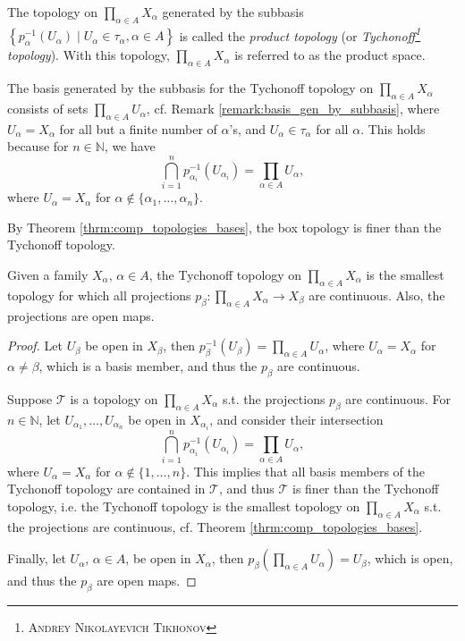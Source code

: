 \begin{defn}
	The topology on $\prod_{\alpha\in A}X_{\alpha}$ generated by the subbasis $\left\{p_{\alpha}^{-1}(U_{\alpha})\mid U_{\alpha}\in\tau_{\alpha}, \alpha\in A\right\}$ is called the \textit{product topology} (or \textit{Tychonoff\footnote{\textsc{Andrey Nikolayevich Tikhonov}} topology}). With this topology, $\prod_{\alpha\in A}X_{\alpha}$ is referred to as the product space.
\end{defn}

\begin{remark}\label{remark:basis_tychonoff_topology}
	The basis generated by the subbasis for the Tychonoff topology on $\prod_{\alpha\in A}X_{\alpha}$ consists of sets $\prod_{\alpha\in A}U_{\alpha}$, cf. Remark \ref{remark:basis_gen_by_subbasis}, where $U_{\alpha} = X_{\alpha}$ for all but a finite number of $\alpha$'s, and $U_{\alpha}\in\tau_{\alpha}$ for all $\alpha$. This holds because for $n\in\mathbb N$, we have
	$$\bigcap_{i=1}^{n} p_{\alpha_i}^{-1}(U_{\alpha_i}) = \prod_{\alpha\in A}U_{\alpha},$$ where $U_{\alpha} = X_{\alpha}$ for $\alpha\notin \{\alpha_1, \dots, \alpha_n\}$.
\end{remark}

\begin{remark}
	By Theorem \ref{thrm:comp_topologies_bases}, the box topology is finer than the Tychonoff topology.
\end{remark}

\begin{theorem}
	Given a family $X_{\alpha}$, $\alpha\in A$, the Tychonoff topology on $\prod_{\alpha\in A}X_{\alpha}$ is the smallest topology for which all projections $p_{\beta}: \prod_{\alpha\in A}X_{\alpha}\to X_{\beta}$ are continuous. Also, the projections are open maps.
\end{theorem}

\begin{proof}
	Let $U_{\beta}$ be open in $X_{\beta}$, then $p_{\beta}^{-1}(U_{\beta}) = \prod_{\alpha\in A}U_{\alpha}$, where $U_{\alpha} = X_{\alpha}$ for $\alpha\ne\beta$, which is a basis member, and thus the $p_{\beta}$ are continuous. 
	
	Suppose $\mathscr T$ is a topology on $\prod_{\alpha\in A}X_{\alpha}$ s.t. the projections $p_{\beta}$ are continuous. For $n\in\mathbb N$, let $U_{\alpha_1}, \dots, U_{\alpha_n}$ be open in $X_{\alpha_i}$, and consider their intersection
	$$\bigcap_{i=1}^{n} p_{\alpha_i}^{-1}(U_{\alpha_i}) = \prod_{\alpha\in A}U_{\alpha},$$
	where $U_{\alpha} = X_{\alpha}$ for $\alpha\notin \{1, \dots, n\}$. This implies that all basis members of the Tychonoff topology are contained in $\mathscr T$, and thus $\mathscr T$ is finer than the Tychonoff topology, i.e. the Tychonoff topology is the smallest topology on $\prod_{\alpha\in A}X_{\alpha}$ s.t. the projections are continuous, cf. Theorem \ref{thrm:comp_topologies_bases}.
	
	Finally, let $U_{\alpha}$, $\alpha\in A$, be open in $X_{\alpha}$, then $p_{\beta}(\prod_{\alpha\in A}U_{\alpha}) = U_{\beta}$, which is open, and thus the $p_{\beta}$ are open maps.
\end{proof}

